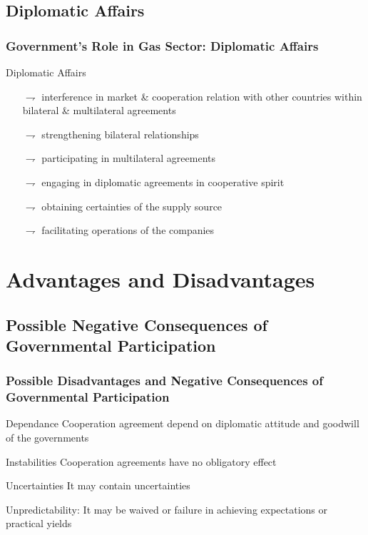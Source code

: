 \documentclass[pdflatex,compress,10pt,
	xcolor={dvipsnames,dvipsnames,svgnames,x11names,table},
	hyperref={
	colorlinks = true,
	breaklinks = true, 
	citecolor=NavyBlue, 
	urlcolor = blue, 
	filecolor=magenta} 
]{beamer}
\begin{document}
\subsection{Diplomatic Affairs}
\begin{frame}\frametitle{Government's Role in Gas Sector: Diplomatic Affairs}

\begin{alertblock}{Diplomatic Affairs}
\begin{itemize}
	\item [$\rightharpoondown$] interference in market \& cooperation relation with other countries within bilateral \& multilateral
agreements
	\item [$\rightharpoondown$] strengthening bilateral relationships 
	\item [$\rightharpoondown$] participating in multilateral agreements 
	\item [$\rightharpoondown$] engaging in diplomatic agreements
in cooperative spirit
	\item [$\rightharpoondown$] obtaining certainties of the supply source
	\item [$\rightharpoondown$] facilitating operations of the companies
\end{itemize}
\end{alertblock}

\end{frame}

\section{Advantages and Disadvantages}
\subsection{Possible Negative Consequences of Governmental Participation}
\begin{frame}\frametitle{Possible Disadvantages and Negative Consequences of Governmental Participation}

\begin{alertblock}{Dependance}
Cooperation agreement depend on diplomatic attitude and goodwill of the governments
\end{alertblock}

\begin{block}{Instabilities}
Cooperation agreements have no obligatory effect
\end{block}

\begin{block}{Uncertainties}
It may contain uncertainties
\end{block}

\begin{examples}{Unpredictability:}
It may be waived or failure in achieving expectations or practical yields
\end{examples}
\end{frame}
\end{document}
